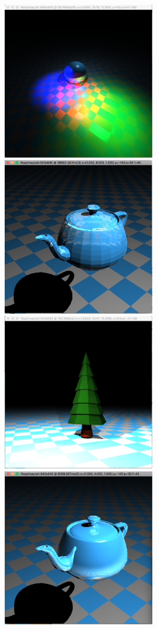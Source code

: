 \includegraphics[width=0.5\textwidth]{img/niceSphere}
\includegraphics[width=0.5\textwidth]{img/refractingTeapot}
\includegraphics[width=0.5\textwidth]{img/simpleTree}
\includegraphics[width=0.5\textwidth]{img/smoothTeapot1}
